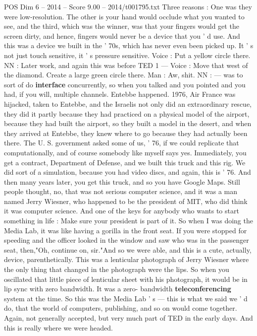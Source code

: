 \begin{textsample}{POS Dim 6 – 2014 – Score 9.00 – 2014/t001795.txt}
Three reasons : One was they were low-resolution.
The other is your hand would occlude what you wanted to see, and the third, which was the winner, was that your fingers would get the screen dirty, and hence, fingers would never be a device that you ' d use.
And this was a device we built in the ' 70s, which has never even been picked up.
It ' s not just touch sensitive, it ' s pressure sensitive.
Voice : Put a yellow circle there.
NN : Later work, and again this was before TED 1 — Voice : Move that west of the diamond.
Create a large green circle there.
Man : Aw, shit.
NN : — was to sort of do \textbf{interface} concurrently, so when you talked and you pointed and you had, if you will, multiple channels.
Entebbe happened. 1976, Air France was hijacked, taken to Entebbe, and the Israelis not only did an extraordinary rescue, they did it partly because they had practiced on a physical model of the airport, because they had built the airport, so they built a model in the desert, and when they arrived at Entebbe, they knew where to go because they had actually been there.
The U.
S. government asked some of us, ' 76, if we could replicate that computationally, and of course somebody like myself says yes.
Immediately, you get a contract, Department of Defense, and we built this truck and this rig.
We did sort of a simulation, because you had video discs, and again, this is ' 76.
And then many years later, you get this truck, and so you have Google Maps.
Still people thought, no, that was not serious computer science, and it was a man named Jerry Wiesner, who happened to be the president of MIT, who did think it was computer science.
And one of the keys for anybody who wants to start something in life : Make sure your president is part of it.
So when I was doing the Media Lab, it was like having a gorilla in the front seat.
If you were stopped for speeding and the officer looked in the window and saw who was in the passenger seat, then,"Oh, continue on, sir."And so we were able, and this is a cute, actually, device, parenthetically.
This was a lenticular photograph of Jerry Wiesner where the only thing that changed in the photograph were the lips.
So when you oscillated that little piece of lenticular sheet with his photograph, it would be in lip sync with zero bandwidth.
It was a zero- bandwidth \textbf{teleconferencing} system at the time.
So this was the Media Lab ' s — this is what we said we ' d do, that the world of computers, publishing, and so on would come together.
Again, not generally accepted, but very much part of TED in the early days.
And this is really where we were headed.

\end{textsample}
